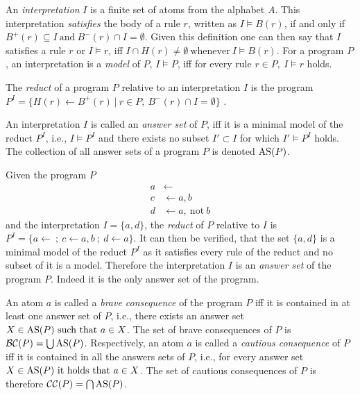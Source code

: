 An \emph{interpretation} $I$ is a finite set of atoms from the alphabet $A$. This interpretation \emph{satisfies} the body of a rule $r$, written as \(I \models B(r)\), if and only if \(B^+(r) \subseteq I\ \text{and}\ B^-(r) \cap I = \emptyset\). Given this definition one can then say that $I$ satisfies a rule $r$ or \(I \models r\), iff \(I \cap H(r) \neq \emptyset \ \text{whenever}\ I \models B(r)\). For a program $P$, an interpretation is a \emph{model} of $P$, \(I \models P\), iff for every rule \(r \in P,\ I \models r\) holds.
\begin{definition}
\label{def:reduct}
    The \emph{reduct} of a program $P$ relative to an interpretation $I$ is the program \(P^I = \{ H(r) \leftarrow B^+(r) \ | \ r \in P,\ B^-(r) \cap I = \emptyset\}\) \cite{GL88}.
\end{definition}
An interpretation $I$ is called an \emph{answer set} of $P$, iff it is a minimal model of the reduct \(P^I\), i.e., \(I \models P^I \) and there exists no subset \( I' \subset I \) for which \( I' \models P^{I}\) holds. The collection of all answer sets of a program $P$ is denoted \(\operatorname{AS}(P)\).
\begin{example}
\label{ex:reduct}
    Given the program $P$
    \begin{align*}
        a &\leftarrow \\
        c &\leftarrow a, b \\
        d &\leftarrow a,\ \text{not}\ b
    \end{align*}
    and the interpretation \(I = \{a, d\}\), the \emph{reduct} of $P$ relative to $I$ is \(P^I = \{a \leftarrow\ ;\ c \leftarrow a, b\ ;\ d \leftarrow a\}\). It can then be verified, that the set \(\{a,d\}\) is a minimal model of the reduct \(P^I\) as it satisfies every rule of the reduct and no subset of it is a model. Therefore the interpretation $I$ is an \emph{answer set} of the program $P$. Indeed it is the only answer set of the program.
\end{example}
An atom $a$ is called a \emph{brave consequence} of the program $P$ iff it is contained in at least one answer set of $P$, i.e., there exists an answer set \(X \in \operatorname{AS}(P) \ \text{such that}\ a \in X\). The set of brave consequences of $P$ is \(\mathcal{BC}(P) = \bigcup \operatorname{AS}(P)\).
Respectively, an atom $a$ is called a \emph{cautious consequence} of $P$ iff it is contained in all the answers sets of $P$, i.e., for every answer set \( X \in \AS(P) \ \text{it holds that}\ a \in X\). The set of cautious consequences of $P$ is therefore \(\mathcal{CC}(P) = \bigcap \operatorname{AS}(P)\).

